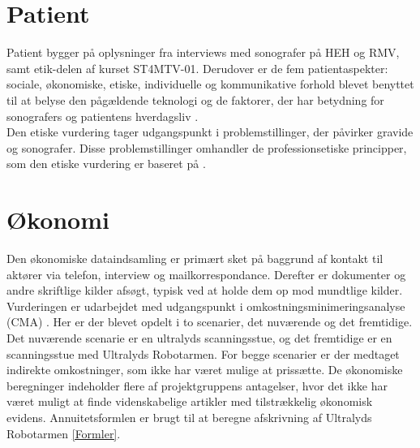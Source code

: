 \section{Patient}
Patient bygger på oplysninger fra interviews med sonografer på HEH og RMV, samt etik-delen af kurset ST4MTV-01. Derudover er de fem patientaspekter: sociale, økonomiske, etiske, individuelle og kommunikative forhold blevet benyttet til at belyse den pågældende teknologi og de faktorer, der har betydning for sonografers og patientens hverdagsliv \cite{Leavitt}.\\ 
Den etiske vurdering tager udgangspunkt i problemstillinger, der påvirker gravide og sonografer. Disse problemstillinger omhandler de professionsetiske principper, som den etiske vurdering er baseret på \cite{Husted} \cite{Etiskehjul}.

\section{Økonomi}
Den økonomiske dataindsamling er primært sket på baggrund af kontakt til aktører via telefon, interview og mailkorrespondance. Derefter er dokumenter og andre skriftlige kilder afsøgt, typisk ved at holde dem op mod mundtlige kilder. Vurderingen er udarbejdet med udgangspunkt i omkostningsminimeringsanalyse (CMA) \cite{Leavitt}. Her er der blevet opdelt i to scenarier, det nuværende og det fremtidige. Det nuværende scenarie er en ultralyds scanningsstue, og det fremtidige er en scanningsstue med Ultralyds Robotarmen. For begge scenarier er der medtaget indirekte omkostninger, som ikke har været mulige at prissætte. De økonomiske beregninger indeholder flere af projektgruppens antagelser, hvor det ikke har været muligt at finde videnskabelige artikler med tilstrækkelig økonomisk evidens. Annuitetsformlen er brugt til at beregne afskrivning af Ultralyds Robotarmen \ref{Formler}. 